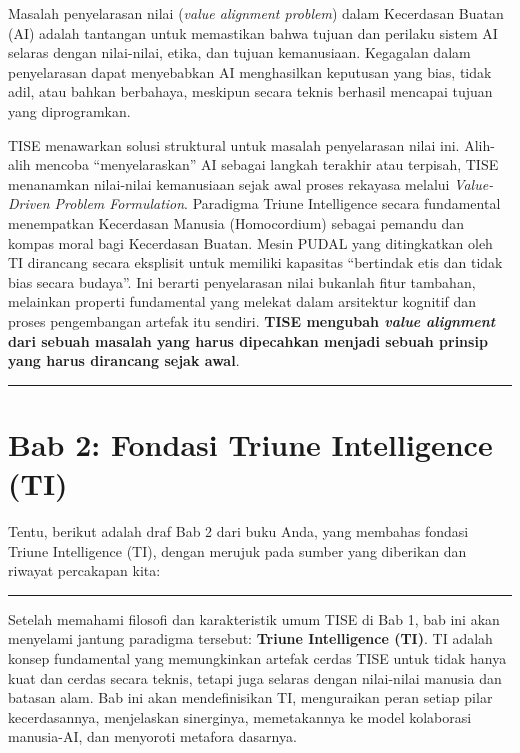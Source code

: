 \documentclass[
  letterpaper,
  DIV=11,
  numbers=noendperiod]{scrreprt}
\begin{document}
Masalah penyelarasan nilai (\emph{value alignment problem}) dalam
Kecerdasan Buatan (AI) adalah tantangan untuk memastikan bahwa tujuan
dan perilaku sistem AI selaras dengan nilai-nilai, etika, dan tujuan
kemanusiaan. Kegagalan dalam penyelarasan dapat menyebabkan AI
menghasilkan keputusan yang bias, tidak adil, atau bahkan berbahaya,
meskipun secara teknis berhasil mencapai tujuan yang diprogramkan.

TISE menawarkan solusi struktural untuk masalah penyelarasan nilai ini.
Alih-alih mencoba ``menyelaraskan'' AI sebagai langkah terakhir atau
terpisah, TISE menanamkan nilai-nilai kemanusiaan sejak awal proses
rekayasa melalui \emph{Value-Driven Problem Formulation}. Paradigma
Triune Intelligence secara fundamental menempatkan Kecerdasan Manusia
(Homocordium) sebagai pemandu dan kompas moral bagi Kecerdasan Buatan.
Mesin PUDAL yang ditingkatkan oleh TI dirancang secara eksplisit untuk
memiliki kapasitas ``bertindak etis dan tidak bias secara budaya''. Ini
berarti penyelarasan nilai bukanlah fitur tambahan, melainkan properti
fundamental yang melekat dalam arsitektur kognitif dan proses
pengembangan artefak itu sendiri. \textbf{TISE mengubah \emph{value
alignment} dari sebuah masalah yang harus dipecahkan menjadi sebuah
prinsip yang harus dirancang sejak awal}.

\begin{center}\rule{0.5\linewidth}{0.5pt}\end{center}


\chapter{\texorpdfstring{\textbf{Bab 2: Fondasi Triune Intelligence
(TI)}}{Bab 2: Fondasi Triune Intelligence (TI)}}\label{bab-2-fondasi-triune-intelligence-ti}

Tentu, berikut adalah draf Bab 2 dari buku Anda, yang membahas fondasi
Triune Intelligence (TI), dengan merujuk pada sumber yang diberikan dan
riwayat percakapan kita:

\begin{center}\rule{0.5\linewidth}{0.5pt}\end{center}

Setelah memahami filosofi dan karakteristik umum TISE di Bab 1, bab ini
akan menyelami jantung paradigma tersebut: \textbf{Triune Intelligence
(TI)}. TI adalah konsep fundamental yang memungkinkan artefak cerdas
TISE untuk tidak hanya kuat dan cerdas secara teknis, tetapi juga
selaras dengan nilai-nilai manusia dan batasan alam. Bab ini akan
mendefinisikan TI, menguraikan peran setiap pilar kecerdasannya,
menjelaskan sinerginya, memetakannya ke model kolaborasi manusia-AI, dan
menyoroti metafora dasarnya.
\end{document}
